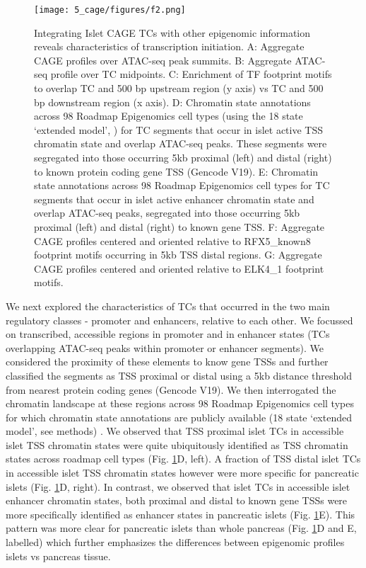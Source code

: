 \begin{figure}
        \centering
        \texttt{[image: 5\_cage/figures/f2.png]}
        \caption[Integrating Islet CAGE TCs with other epigenomic information reveals characteristics of transcription initiation]{Integrating Islet CAGE TCs with other epigenomic information reveals characteristics of transcription initiation. A: Aggregate CAGE profiles over ATAC-seq peak summits. B: Aggregate ATAC-seq profile over TC midpoints. C: Enrichment of TF footprint motifs to overlap TC and 500 bp upstream region (y axis) vs TC and 500 bp downstream region (x axis). D: Chromatin state annotations across 98 Roadmap Epigenomics cell types (using the 18 state ‘extended model’, \cite{consortiumIntegrativeAnalysis1112015}) for TC segments that occur in islet active TSS chromatin state and overlap ATAC-seq peaks. These segments were segregated into those occurring 5kb proximal (left) and distal (right) to known protein coding gene TSS (Gencode V19). E: Chromatin state annotations across 98 Roadmap Epigenomics cell types for TC segments that occur in islet active enhancer chromatin state and overlap ATAC-seq peaks, segregated into those occurring 5kb proximal (left) and distal (right) to known gene TSS. F: Aggregate CAGE profiles centered and oriented relative to RFX5\_known8 footprint motifs occurring in 5kb TSS distal regions. G: Aggregate CAGE profiles centered and oriented relative to ELK4\_1 footprint motifs.}
        \label{fig:c5_f2}
\end{figure}


We next explored the characteristics of TCs that occurred in the two main regulatory classes - promoter and enhancers, relative to each other. We focussed on transcribed, accessible regions in promoter and in enhancer states (TCs overlapping ATAC-seq peaks within promoter or enhancer segments). We considered the proximity of these elements to know gene TSSs and further classified the segments as TSS proximal or distal using a 5kb distance threshold from nearest protein coding genes (Gencode V19). We then interrogated the chromatin landscape at these regions across 98 Roadmap Epigenomics cell types for which chromatin state annotations are publicly available (18 state ‘extended model’, see methods) \cite{consortiumIntegrativeAnalysis1112015}. We observed that TSS proximal islet TCs in accessible islet TSS chromatin states were quite ubiquitously identified as TSS chromatin states across roadmap cell types (Fig. \ref{fig:c5_f2}D, left). A fraction of TSS distal islet TCs in accessible islet TSS chromatin states however were more specific for pancreatic islets (Fig. \ref{fig:c5_f2}D, right). In contrast, we observed that islet TCs in accessible islet enhancer chromatin states, both proximal and distal to known gene TSSs were more specifically identified as enhancer states in pancreatic islets (Fig. \ref{fig:c5_f2}E). This pattern was more clear for pancreatic islets than whole pancreas (Fig. \ref{fig:c5_f2}D and E, labelled) which further emphasizes the differences between epigenomic profiles islets vs pancreas tissue. 


